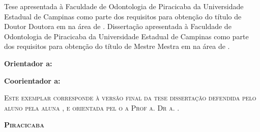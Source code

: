 \begin{flushright}
	\begin{minipage}[c]{.5\textwidth}
		\ifx\mestrado\undefined
		Tese apresentada à Faculdade de Odontologia de Piracicaba da Universidade Estadual de Campinas como parte dos requisitos para obtenção do título de \ifx\femaleAuthor\undefined
		Doutor
		\else
		Doutora
		\fi
		em \titulodoc{} na área de \areadoc . 
		\else
		Dissertação apresentada à Faculdade de Odontologia de Piracicaba da Universidade Estadual de Campinas como parte dos requisitos para obtenção do título de \ifx\femaleAuthor\undefined
		Mestre
		\else
		Mestra
		\fi
		em \titulodoc{} na área de \areadoc .
		\fi

		
		\end{minipage}
\end{flushright}
\vspace{.5cm}

\noindent
\textbf{Orientador\ifx\femaleOrientador\undefined
	\else
	a\fi: \orientador
}
\vspace{.25cm}

\ifx\coorientador\undefined
\else
\noindent
\textbf{Coorientador\ifx\femaleCoorientador\undefined
	\else
	a\fi: \coorientador
}
\vspace{.5cm}
\fi

\noindent
\begin{minipage}[c]{.5\textwidth}
	{\footnotesize\textsc{Este exemplar corresponde à versão final da
			\ifx\mestrado\undefined
			tese
			\else
			dissertação
			\fi
			defendida
			\ifx\femaleAuthor\undefined
			pelo aluno
			\else
			pela aluna
			\fi
			\autor,
			e orientada pel\ifx\femaleOrientador\undefined
			o\else
			a\fi{} Prof\ifx\femaleOrientador\undefined
			\else
			a\fi. Dr\ifx\femaleOrientador\undefined
			\else
			a\fi. \orientador.
		}}
	\end{minipage}
	\vspace{1cm}
	
	\noindent
	
	\vspace{.5cm}
	
	
	\vfill
	\begin{center}
		{\small\textbf{\textsc{ Piracicaba \\ \ano}}}
	\end{center}


\clearpage





